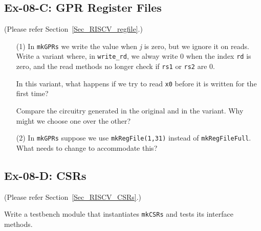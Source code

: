 
\subsection*{Ex-08-C: GPR Register Files}
\label{Ex-08-C-GPR-Register-Files}

(Please refer Section~\ref{Sec_RISCV_regfile}.)

\begin{itemize}

\item[(1)] In {\tt mkGPRs} we write the value when \emph{j} is zero, but we
      ignore it on reads.  Write a variant where, in {\tt write\_rd},
      we alway write 0 when the index {\tt rd} is zero, and the read
      methods no longer check if {\tt rs1} or {\tt rs2} are 0.

      In this variant, what happens if we try to read {\tt x0} before
      it is written for the first time?

      Compare the circuitry generated in the original and in the
      variant.  Why might we choose one over the other?

\item[(2)] In {\tt mkGPRs} suppose we use {\tt mkRegFile(1,31)} instead of
      {\tt mkRegFileFull}.  What needs to change to accommodate this?

\end{itemize}


\subsection*{Ex-08-D: CSRs}
\label{Ex-08-D-CSRs}

(Please refer Section~\ref{Sec_RISCV_CSRs}.)

Write a testbench module that instantiates {\tt mkCSRs} and tests its
interface methods.

